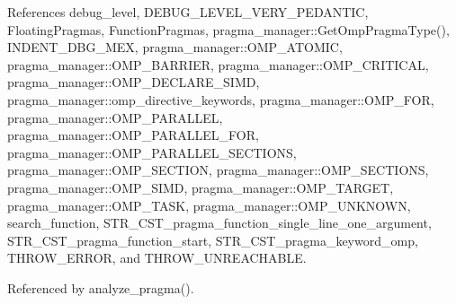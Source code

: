 References debug\+\_\+level, D\+E\+B\+U\+G\+\_\+\+L\+E\+V\+E\+L\+\_\+\+V\+E\+R\+Y\+\_\+\+P\+E\+D\+A\+N\+T\+IC, Floating\+Pragmas, Function\+Pragmas, pragma\+\_\+manager\+::\+Get\+Omp\+Pragma\+Type(), I\+N\+D\+E\+N\+T\+\_\+\+D\+B\+G\+\_\+\+M\+EX, pragma\+\_\+manager\+::\+O\+M\+P\+\_\+\+A\+T\+O\+M\+IC, pragma\+\_\+manager\+::\+O\+M\+P\+\_\+\+B\+A\+R\+R\+I\+ER, pragma\+\_\+manager\+::\+O\+M\+P\+\_\+\+C\+R\+I\+T\+I\+C\+AL, pragma\+\_\+manager\+::\+O\+M\+P\+\_\+\+D\+E\+C\+L\+A\+R\+E\+\_\+\+S\+I\+MD, pragma\+\_\+manager\+::omp\+\_\+directive\+\_\+keywords, pragma\+\_\+manager\+::\+O\+M\+P\+\_\+\+F\+OR, pragma\+\_\+manager\+::\+O\+M\+P\+\_\+\+P\+A\+R\+A\+L\+L\+EL, pragma\+\_\+manager\+::\+O\+M\+P\+\_\+\+P\+A\+R\+A\+L\+L\+E\+L\+\_\+\+F\+OR, pragma\+\_\+manager\+::\+O\+M\+P\+\_\+\+P\+A\+R\+A\+L\+L\+E\+L\+\_\+\+S\+E\+C\+T\+I\+O\+NS, pragma\+\_\+manager\+::\+O\+M\+P\+\_\+\+S\+E\+C\+T\+I\+ON, pragma\+\_\+manager\+::\+O\+M\+P\+\_\+\+S\+E\+C\+T\+I\+O\+NS, pragma\+\_\+manager\+::\+O\+M\+P\+\_\+\+S\+I\+MD, pragma\+\_\+manager\+::\+O\+M\+P\+\_\+\+T\+A\+R\+G\+ET, pragma\+\_\+manager\+::\+O\+M\+P\+\_\+\+T\+A\+SK, pragma\+\_\+manager\+::\+O\+M\+P\+\_\+\+U\+N\+K\+N\+O\+WN, search\+\_\+function, S\+T\+R\+\_\+\+C\+S\+T\+\_\+pragma\+\_\+function\+\_\+single\+\_\+line\+\_\+one\+\_\+argument, S\+T\+R\+\_\+\+C\+S\+T\+\_\+pragma\+\_\+function\+\_\+start, S\+T\+R\+\_\+\+C\+S\+T\+\_\+pragma\+\_\+keyword\+\_\+omp, T\+H\+R\+O\+W\+\_\+\+E\+R\+R\+OR, and T\+H\+R\+O\+W\+\_\+\+U\+N\+R\+E\+A\+C\+H\+A\+B\+LE.



Referenced by analyze\+\_\+pragma().


